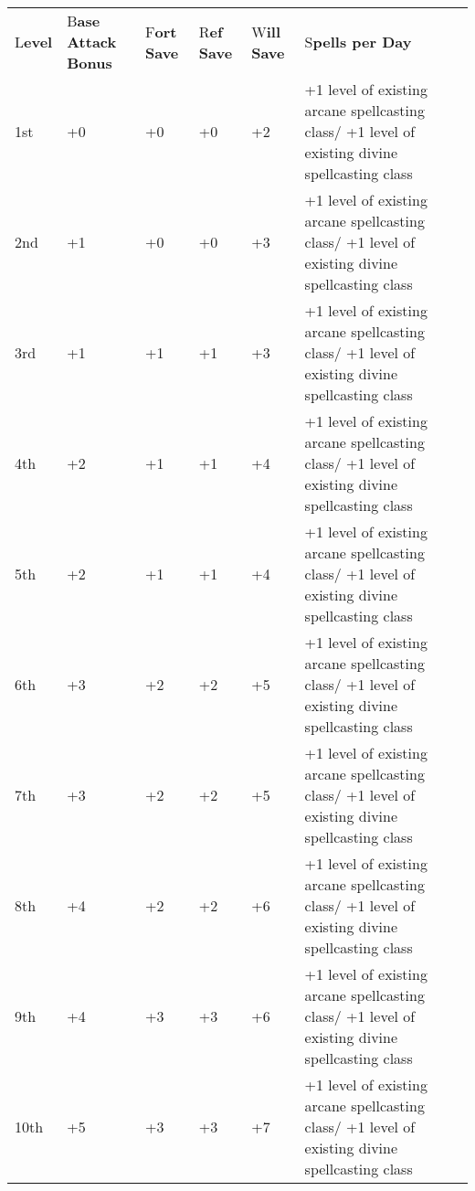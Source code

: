 \documentclass{article}
\begin{document}
\vspace{12pt}
\parindent=0pt
\begin{tabular}{|>{\raggedright}p{24pt}|>{\raggedright}p{29pt}|>{\raggedright}p{20pt}|>{\raggedright}p{20pt}|>{\raggedright}p{20pt}|>{\raggedright}p{162pt}|}
\hline
\multicolumn{6}{|p{278pt}|}{T\textbf{able: The Mystic Theurge}}\tabularnewline
\hline
L\textbf{evel} & B\textbf{ase}\linebreak{}
\textbf{Attack}\linebreak{}
\textbf{Bonus} & F\textbf{ort}\linebreak{}
\textbf{Save} & R\textbf{ef}\linebreak{}
\textbf{Save} & W\textbf{ill}\linebreak{}
\textbf{Save} & S\textbf{pells per Day}\tabularnewline
\hline
1st & +0 & +0 & +0 & +2 & +1 level of existing arcane spellcasting class/\linebreak{}
+1 level of existing divine spellcasting class\tabularnewline
\hline
2nd & +1 & +0 & +0 & +3 & +1 level of existing arcane spellcasting class/\linebreak{}
+1 level of existing divine spellcasting class\tabularnewline
\hline
3rd & +1 & +1 & +1 & +3 & +1 level of existing arcane spellcasting class/\linebreak{}
+1 level of existing divine spellcasting class\tabularnewline
\hline
4th & +2 & +1 & +1 & +4 & +1 level of existing arcane spellcasting class/\linebreak{}
+1 level of existing divine spellcasting class\tabularnewline
\hline
5th & +2 & +1 & +1 & +4 & +1 level of existing arcane spellcasting class/\linebreak{}
+1 level of existing divine spellcasting class\tabularnewline
\hline
6th & +3 & +2 & +2 & +5 & +1 level of existing arcane spellcasting class/\linebreak{}
+1 level of existing divine spellcasting class\tabularnewline
\hline
7th & +3 & +2 & +2 & +5 & +1 level of existing arcane spellcasting class/\linebreak{}
+1 level of existing divine spellcasting class\tabularnewline
\hline
8th & +4 & +2 & +2 & +6 & +1 level of existing arcane spellcasting class/\linebreak{}
+1 level of existing divine spellcasting class\tabularnewline
\hline
9th & +4 & +3 & +3 & +6 & +1 level of existing arcane spellcasting class/\linebreak{}
+1 level of existing divine spellcasting class\tabularnewline
\hline
10th & +5 & +3 & +3 & +7 & +1 level of existing arcane spellcasting class/\linebreak{}
+1 level of existing divine spellcasting class\tabularnewline
\hline
\end{tabular}
\end{document}
